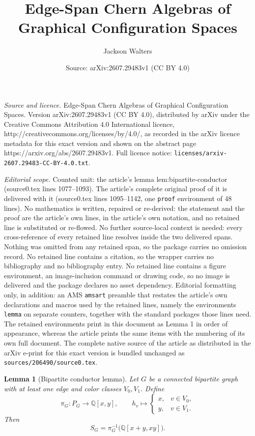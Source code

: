 \documentclass[10pt,a4paper]{amsart}
\title{Edge-Span Chern Algebras of Graphical Configuration Spaces}
\author{Jackson Walters}
\date{Source: arXiv:2607.29483v1 (CC BY 4.0)}
\newtheorem{lemma}{Lemma}
\newcommand{\Q}{\mathbb{Q}}
\begin{document}
\maketitle

\noindent\emph{Source and licence.} Edge-Span Chern Algebras of Graphical Configuration Spaces. Version arXiv:2607.29483v1 (CC BY 4.0), distributed by arXiv under the Creative Commons Attribution 4.0 International licence, http://creativecommons.org/licenses/by/4.0/, as recorded in the arXiv licence metadata for this exact version and shown on the abstract page https://arxiv.org/abs/2607.29483v1. Full licence notice: \texttt{licenses/arxiv-2607.29483-CC-BY-4.0.txt}.\par\smallskip

\noindent\textit{Editorial scope.} Counted unit: the article's lemma lem:bipartite-conductor (source0.tex lines 1077--1093). The article's complete original proof of it is delivered with it (source0.tex lines 1095--1142, one \texttt{proof} environment of 48 lines). No mathematics is written, repaired or re-derived: the statement and the proof are the article's own lines, in the article's own notation, and no retained line is substituted or re-flowed.  No further source-local context is needed: every cross-reference of every retained line resolves inside the two delivered spans.  Nothing was omitted from any retained span, so the package carries no omission record.  No retained line contains a citation, so the wrapper carries no bibliography and no bibliography entry.  No retained line contains a figure environment, an image-inclusion command or drawing code, so no image is delivered and the package declares no asset dependency.  Editorial formatting only, in addition: an AMS \texttt{amsart} preamble that restates the article's own declarations and macros used by the retained lines, namely the environments \texttt{lemma} on separate counters, together with the standard packages those lines need.  The retained environments print in this document as Lemma 1 in order of appearance, whereas the article prints the same items with the numbering of its own full document.  The complete native source of the article as distributed in the arXiv e-print for this exact version is bundled unchanged as \texttt{sources/206490/source0.tex}.
\begin{lemma}[Bipartite conductor lemma]\label{lem:bipartite-conductor}
Let $G$ be a connected bipartite graph with at least one edge and color
classes $V_0,V_1$.  Define
\[
  \pi_G:P_G\longrightarrow\Q[x,y],
  \qquad
  h_v\longmapsto
  \begin{cases}
    x,&v\in V_0,\\
    y,&v\in V_1.
  \end{cases}
\]
Then
\begin{equation}\label{eq:polynomial-bipartite-preimage}
  S_G=\pi_G^{-1}\bigl(\Q[x+y,xy]\bigr).
\end{equation}
\end{lemma}
\end{document}
